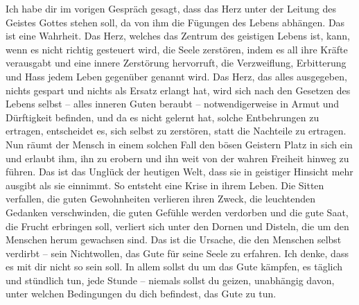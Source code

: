 Ich habe dir im vorigen Gespräch gesagt, dass das Herz unter der Leitung des Geistes Gottes stehen soll, da von ihm die Fügungen des Lebens abhängen. Das ist eine Wahrheit. Das Herz, welches das Zentrum des geistigen Lebens ist, kann, wenn es nicht richtig gesteuert wird, die Seele zerstören, indem es all ihre Kräfte verausgabt und eine innere Zerstörung hervorruft, die Verzweiflung, Erbitterung und Hass jedem Leben gegenüber genannt wird. Das Herz, das alles ausgegeben, nichts gespart und nichts als Ersatz erlangt hat, wird sich nach den Gesetzen des Lebens selbst -- alles inneren Guten beraubt -- notwendigerweise in Armut und Dürftigkeit befinden, und da es nicht gelernt hat, solche Entbehrungen zu ertragen, entscheidet es, sich selbst zu zerstören, statt die Nachteile zu ertragen. Nun räumt der Mensch in einem solchen Fall den bösen Geistern Platz in sich ein und erlaubt ihm, ihn zu erobern und ihn weit von der wahren Freiheit hinweg zu führen. Das ist das Unglück der heutigen Welt, dass sie in geistiger Hinsicht mehr ausgibt als sie einnimmt. So entsteht eine Krise in ihrem Leben. Die Sitten verfallen, die guten Gewohnheiten verlieren ihren Zweck, die leuchtenden Gedanken verschwinden, die guten Gefühle werden verdorben und die gute Saat, die Frucht erbringen soll, verliert sich unter den Dornen und Disteln, die um den Menschen herum gewachsen sind. Das ist die Ursache, die den Menschen selbst verdirbt -- sein Nichtwollen, das Gute für seine Seele zu erfahren. Ich denke, dass es mit dir nicht so sein soll. In allem sollst du um das Gute kämpfen, es täglich und stündlich tun, jede Stunde -- niemals sollst du geizen, unabhängig davon, unter welchen Bedingungen du dich befindest, das Gute zu tun. 

